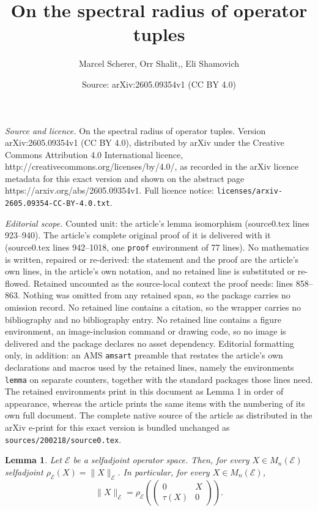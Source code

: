 \documentclass[10pt,a4paper]{amsart}
\title{On the spectral radius of operator tuples}
\author{Marcel Scherer, Orr Shalit,, Eli Shamovich}
\date{Source: arXiv:2605.09354v1 (CC BY 4.0)}
\newtheorem{lemma}{Lemma}
\newcommand{\cE}{\mathcal{E}}
\begin{document}
\maketitle

\noindent\emph{Source and licence.} On the spectral radius of operator tuples. Version arXiv:2605.09354v1 (CC BY 4.0), distributed by arXiv under the Creative Commons Attribution 4.0 International licence, http://creativecommons.org/licenses/by/4.0/, as recorded in the arXiv licence metadata for this exact version and shown on the abstract page https://arxiv.org/abs/2605.09354v1. Full licence notice: \texttt{licenses/arxiv-2605.09354-CC-BY-4.0.txt}.\par\smallskip

\noindent\textit{Editorial scope.} Counted unit: the article's lemma isomorphism (source0.tex lines 923--940). The article's complete original proof of it is delivered with it (source0.tex lines 942--1018, one \texttt{proof} environment of 77 lines). No mathematics is written, repaired or re-derived: the statement and the proof are the article's own lines, in the article's own notation, and no retained line is substituted or re-flowed.  Retained uncounted as the source-local context the proof needs: lines 858--863.  Nothing was omitted from any retained span, so the package carries no omission record.  No retained line contains a citation, so the wrapper carries no bibliography and no bibliography entry.  No retained line contains a figure environment, an image-inclusion command or drawing code, so no image is delivered and the package declares no asset dependency.  Editorial formatting only, in addition: an AMS \texttt{amsart} preamble that restates the article's own declarations and macros used by the retained lines, namely the environments \texttt{lemma} on separate counters, together with the standard packages those lines need.  The retained environments print in this document as Lemma 1 in order of appearance, whereas the article prints the same items with the numbering of its own full document.  The complete native source of the article as distributed in the arXiv e-print for this exact version is bundled unchanged as \texttt{sources/200218/source0.tex}.
\begin{lemma}\label{lem: radius=norm}
    Let $\mathcal{E}$ be a selfadjoint operator space. Then, for every $X \in M_n(\cE)$ selfadjoint $\rho_{\cE}(X) = \|X\|_{\cE}$. In particular, for every $X \in M_n(\cE)$,
      \[
      \|X\|_{\mathcal{E}}=\rho_\mathcal{E}\left(\begin{pmatrix} 0 & X\\ \tau(X) & 0\end{pmatrix}\right).
      \]
\end{lemma}
\end{document}
